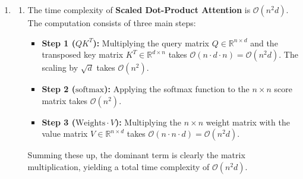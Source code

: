 \documentclass[12pt,a4paper]{article}
\makeatletter
\newtheorem*{solution}{Solution}
\theoremstyle{definition}
\renewenvironment{solution}[1][Solution] {\par\pushQED{\qed}\normalfont\topsep6\p@\@plus6\p@\relax\trivlist\item[\hskip\labelsep\bfseries#1\@addpunct{.}]\ignorespaces}{\popQED\endtrivlist\@endpefalse} \makeatother
\makeatother
\begin{document}
\begin{enumerate}
\begin{solution}
\begin{enumerate}
    \begin{algorithm}[H]
    \setcounter{AlgoLine}{0}
    \BlankLine
    $ConcatOutput \leftarrow \Concat{$head_1, \dots, head_h$}$\;
    $FinalOutput \leftarrow ConcatOutput \cdot W^O$\;
    \Return $FinalOutput$\;
    \caption{Multi-Head Attention}\label{algo_mha}
    \end{algorithm}
        \item \label{ques_b} The time complexity of \textbf{Scaled Dot-Product Attention} is $\mathcal{O}(n^2 d)$.
        The computation consists of three main steps:
        \begin{itemize}
            \item \textbf{Step 1 ($QK^T$):} Multiplying the query matrix $Q \in \mathbb{R}^{n \times d}$ and the transposed key matrix $K^T \in \mathbb{R}^{d \times n}$ takes $\mathcal{O}(n\cdot d\cdot n) = \mathcal{O}(n^2 d)$. The scaling by $\sqrt{d}$ takes $\mathcal{O}(n^2)$.
            \item \textbf{Step 2 ($\text{softmax}$):} Applying the softmax function to the $n \times n$ score matrix takes $\mathcal{O}(n^2)$.
            \item \textbf{Step 3 ($\text{Weights} \cdot V$):} Multiplying the $n\times n$ weight matrix with the value matrix $V \in \mathbb{R}^{n \times d}$ takes $\mathcal{O}(n \cdot n \cdot d) = \mathcal{O}(n^2 d)$.
        \end{itemize}
        Summing these up, the dominant term is clearly the matrix multiplication, yielding a total time complexity of $\mathcal{O}(n^2 d)$.


\end{enumerate}
\end{solution}
\end{enumerate}
\end{document}
